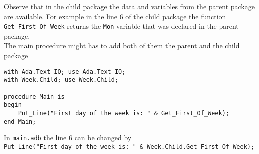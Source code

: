 \documentclass[paper=a4, fontsize=11pt]{scrartcl} %
\numberwithin{equation}{section} %
\numberwithin{figure}{section} %
\numberwithin{table}{section} %
\begin{document}
Observe that in the child package the data and variables from the parent package are available. For example in the line 6 of the child package the function \verb|Get_First_Of_Week| returns the \verb|Mon| variable that was declared in the parent package.\\

The main procedure might has to add both of them the parent and the child package

\begin{lstlisting}[caption = {main.adb}, label = {program_04}]
with Ada.Text_IO; use Ada.Text_IO; 
with Week.Child; use Week.Child;

procedure Main is
begin
	Put_Line("First day of the week is: " & Get_First_Of_Week);
end Main;
\end{lstlisting}

In \verb|main.adb| the line 6 can be changed by\\
\verb|Put_Line("First day of the week is: " & Week.Child.Get_First_Of_Week);|
\end{document}
